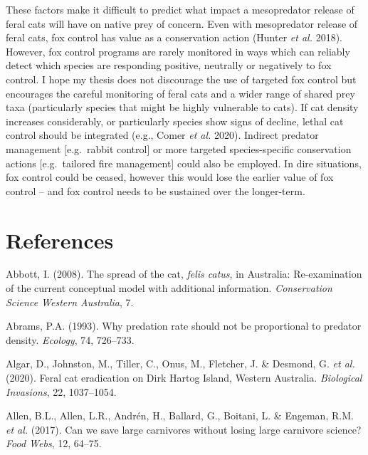 \documentclass[11pt,a4paper,titlepage,twoside,openright]{style/unimelbthesis}
\begin{document}
\begin{mainmatter}
These factors make it difficult to predict what impact a mesopredator release of feral cats will have on native prey of concern. Even with mesopredator release of feral cats, fox control has value as a conservation action (Hunter \emph{et al.} 2018). However, fox control programs are rarely monitored in ways which can reliably detect which species are responding positive, neutrally or negatively to fox control. I hope my thesis does not discourage the use of targeted fox control but encourages the careful monitoring of feral cats and a wider range of shared prey taxa (particularly species that might be highly vulnerable to cats). If cat density increases considerably, or particularly species show signs of decline, lethal cat control should be integrated (e.g., Comer \emph{et al.} 2020). Indirect predator management {[}e.g.~rabbit control{]} or more targeted species-specific conservation actions {[}e.g.~tailored fire management{]} could also be employed. In dire situations, fox control could be ceased, however this would lose the earlier value of fox control -- and fox control needs to be sustained over the longer-term.

\hypertarget{references}{%
\chapter*{References}\label{references}}


\noindent

\setlength{\parindent}{-0.20in}
\setlength{\leftskip}{0.20in}

\hypertarget{refs}{}
\leavevmode\hypertarget{ref-abbott2008spread}{}%
Abbott, I. (2008). The spread of the cat, \emph{felis catus}, in Australia: Re-examination of the current conceptual model with additional information. \emph{Conservation Science Western Australia}, 7.

\leavevmode\hypertarget{ref-abrams1993predation}{}%
Abrams, P.A. (1993). Why predation rate should not be proportional to predator density. \emph{Ecology}, 74, 726--733.

\leavevmode\hypertarget{ref-algar2020feral}{}%
Algar, D., Johnston, M., Tiller, C., Onus, M., Fletcher, J. \& Desmond, G. \emph{et al.} (2020). Feral cat eradication on Dirk Hartog Island, Western Australia. \emph{Biological Invasions}, 22, 1037--1054.

\leavevmode\hypertarget{ref-allen2017can}{}%
Allen, B.L., Allen, L.R., Andrén, H., Ballard, G., Boitani, L. \& Engeman, R.M. \emph{et al.} (2017). Can we save large carnivores without losing large carnivore science? \emph{Food Webs}, 12, 64--75.


\end{mainmatter}
\end{document}
